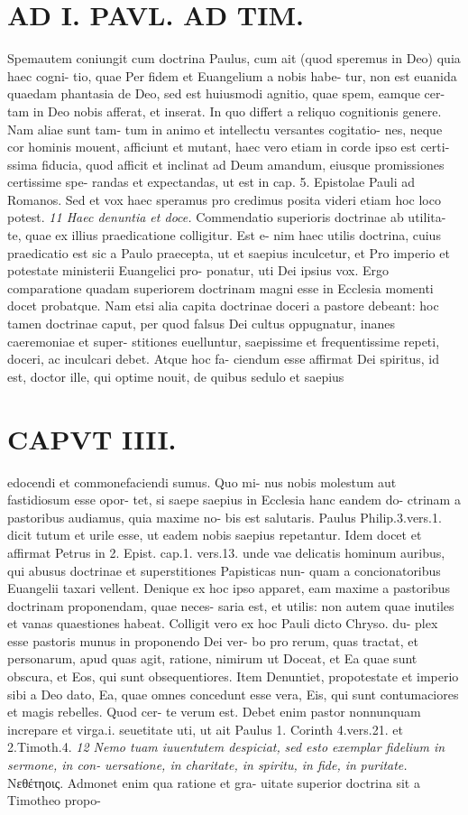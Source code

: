 \documentclass{article}
\begin{document}
\begin{pages}
\section*{AD I. PAVL. AD TIM. }
\marginpar{[ p.226 ]}Spemautem coniungit cum doctrina Paulus, cum ait (quod speremus in Deo) quia haec cogni- tio, quae Per fidem et Euangelium a nobis habe- tur, non est euanida quaedam phantasia de Deo, sed est huiusmodi agnitio, quae spem, eamque cer- tam in Deo nobis afferat, et inserat. In quo differt a reliquo cognitionis genere. Nam aliae sunt tam- tum in animo et intellectu versantes cogitatio- nes, neque cor hominis mouent, afficiunt et mutant, haec vero etiam in corde ipso est certi- ssima fiducia, quod afficit et inclinat ad Deum amandum, eiusque promissiones certissime spe- randas et expectandas, ut est in cap. 5. Epistolae Pauli ad Romanos. Sed et vox haec speramus pro credimus posita videri etiam hoc loco potest. \textit{11 Haec denuntia et doce.} Commendatio superioris doctrinae ab utilita- te, quae ex illius praedicatione colligitur. Est e- nim haec utilis doctrina, cuius praedicatio est sic a Paulo praecepta, ut et saepius inculcetur, et Pro imperio et potestate ministerii Euangelici pro- ponatur, uti Dei ipsius vox. Ergo comparatione quadam superiorem doctrinam magni esse in Ecclesia momenti docet probatque. Nam etsi alia capita doctrinae doceri a pastore debeant: hoc tamen doctrinae caput, per quod falsus Dei cultus oppugnatur, inanes caeremoniae et super- stitiones euelluntur, saepissime et frequentissime repeti, doceri, ac inculcari debet. Atque hoc fa- ciendum esse affirmat Dei spiritus, id est, doctor ille, qui optime nouit, de quibus sedulo et saepius 
\section*{CAPVT  IIII. }
\marginpar{[ p.227 ]}edocendi et commonefaciendi sumus. Quo mi- nus nobis molestum aut fastidiosum esse opor- tet, si saepe saepius in Ecclesia hanc eandem do- ctrinam a pastoribus audiamus, quia maxime no- bis est salutaris. Paulus Philip.3.vers.1. dicit tutum et urile esse, ut eadem nobis saepius repetantur. Idem docet et affirmat Petrus in 2. Epist. cap.1. vers.13. unde vae delicatis hominum auribus, qui abusus doctrinae et superstitiones Papisticas nun- quam a concionatoribus Euangelii taxari vellent. Denique ex hoc ipso apparet, eam maxime a pastoribus doctrinam proponendam, quae neces- saria est, et utilis: non autem quae inutiles et vanas quaestiones habeat. Colligit vero ex hoc Pauli dicto Chryso. du- plex esse pastoris munus in proponendo Dei ver- bo pro rerum, quas tractat, et personarum, apud quas agit, ratione, nimirum ut Doceat, et Ea quae sunt obscura, et Eos, qui sunt obsequentiores. Item Denuntiet, propotestate et imperio sibi a Deo dato, Ea, quae omnes concedunt esse vera, Eis, qui sunt contumaciores et magis rebelles. Quod cer- te verum est. Debet enim pastor nonnunquam increpare et virga.i. seuetitate uti, ut ait Paulus 1. Corinth 4.vers.21. et 2.Timoth.4. \textit{12 Nemo tuam iuuentutem despiciat,} \textit{sed esto exemplar fidelium in sermone, in con-} \textit{uersatione, in charitate, in spiritu, in fide, in} \textit{puritate.} Νεθέτηοις. Admonet enim qua ratione et gra- uitate superior doctrina sit a Timotheo propo- 

\end{pages}
\end{document}
